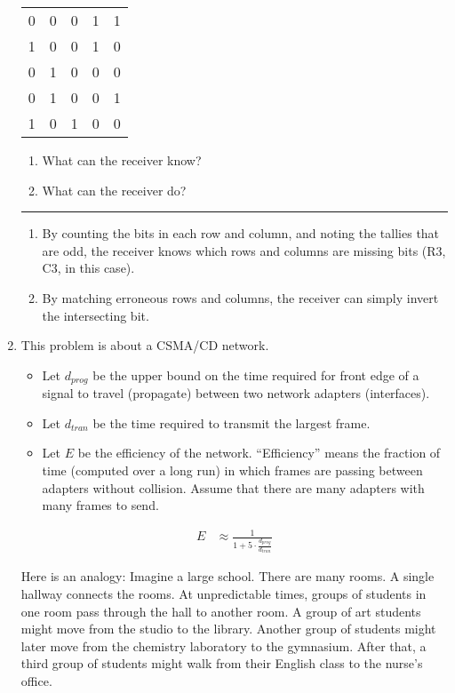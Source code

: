\documentclass[twoside]{article}
\newenvironment{answer}
  {\vspace*{0.2cm} \rule{12cm}{0.04cm} \vspace*{0.2cm}}
  {\vspace*{0.2cm}}
\begin{document}
\begin{enumerate}
  \begin{tabular}{llll|l}
    0 & 0 & 0 & 1 & 1 \\
    1 & 0 & 0 & 1 & 0 \\
    0 & 1 & 0 & 0 & 0 \\
    0 & 1 & 0 & 0 & 1 \\ \hline
    1 & 0 & 1 & 0 & 0
    \end{tabular}

    \begin{enumerate}
      \item What can the receiver know?
      \item What can the receiver do?
      \end{enumerate}

  \begin{answer}

  \begin{enumerate}
    \item By counting the bits in each row and column, and noting the tallies that are odd, the receiver
	knows which rows and columns are missing bits (R3, C3, in this case).
    \item By matching erroneous rows and columns, the receiver can simply invert the intersecting bit.
    \end{enumerate}

    \end{answer}

  \item This problem is about a CSMA/CD network.
  \begin{itemize}
    \item Let $d_{prog}$ be the upper bound on the time required
      for front edge of a signal to travel (propagate) between two network adapters (interfaces).
    \item Let $d_{tran}$ be the time required to transmit the largest frame.
    \item Let $E$ be the efficiency of the network. ``Efficiency'' means the
      fraction of time (computed over a long run) in which frames are passing
      between adapters without collision. Assume that there are many adapters
      with many frames to send.
    \end{itemize}

  \begin{align*}
    E & \approx \frac{1}{1 + 5 \cdot \frac{d_{prog}}{d_{tran}}}
    \end{align*}

    Here is an analogy: Imagine a large school. There are many rooms.
    A single hallway connects the rooms. At unpredictable times, groups of students in
    one room pass through the hall to another room. A group of art
    students might move from the studio to the library. Another group of
    students might later move from the chemistry laboratory to the gymnasium.
    After that, a third group of students might walk from their English class to
    the nurse's office.


\end{enumerate}
\end{document}
